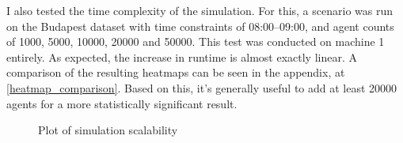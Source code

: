 I also tested the time complexity of the simulation. For this, a scenario was run on the Budapest dataset with time constraints of 08:00--09:00, and agent counts of 1000, 5000, 10000, 20000 and 50000. This test was conducted on machine 1 entirely. As expected, the increase in runtime is almost exactly linear. A comparison of the resulting heatmaps can be seen in the appendix, at \ref{heatmap_comparison}. Based on this, it's generally useful to add at least 20000 agents for a more statistically significant result.

\begin{figure}[h!]
    \centering
    \caption{Plot of simulation scalability}
\end{figure}